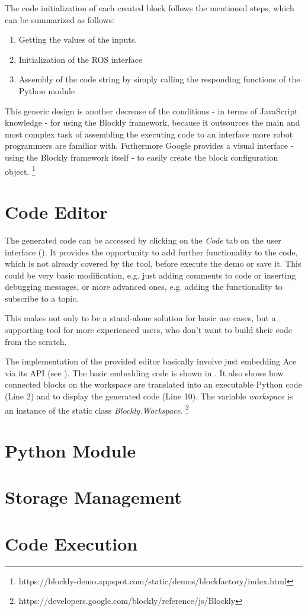 The code initialization of each created block follows the mentioned steps, which can be summarized as follows:
\begin{enumerate}
	\item Getting the values of the inputs.
	\item Initialization of the ROS interface
	\item Assembly of the code string by simply calling the responding functions of the Python module
\end{enumerate}

This generic design is another decrease of the conditions - in terms of JavaScript knowledge - for using the Blockly framework, because it outsources the main and most complex task of assembling the executing code to an interface more robot programmers are familiar with. Futhermore Google provides a visual interface - using the Blockly framework itself - to easily create the block configuration object. \footnote{https://blockly-demo.appspot.com/static/demos/blockfactory/index.html}

\section{Code Editor}
The generated code can be accessed by clicking on the \textit{Code} tab on the user interface (). It provides the opportunity to add further functionality to the code, which is not already covered by the tool, before execute the demo or save it. This could be very basic modification, e.g. just adding comments to code or inserting debugging messages, or more advanced ones, e.g. adding the functionality to subscribe to a topic.

This makes \toolname{} not only to be a stand-alone solution for basic use cases, but a supporting tool for more experienced users, who don't want to build their code from the scratch.

\begin{figure}[htbp]
	
\end{figure}

The implementation of the provided editor basically involve just embedding Ace via its API (see ). The basic embedding code is shown in . It also shows how connected blocks on the workspace are translated into an executable Python code (Line 2) and to display the generated code (Line 10). The variable \textit{workspace} is an instance of the static class \textit{Blockly.Workspace}. \footnote{https://developers.google.com/blockly/reference/js/Blockly}

\section{Python Module} \label{sec:PythonModule}

\section{Storage Management}

\section{Code Execution}